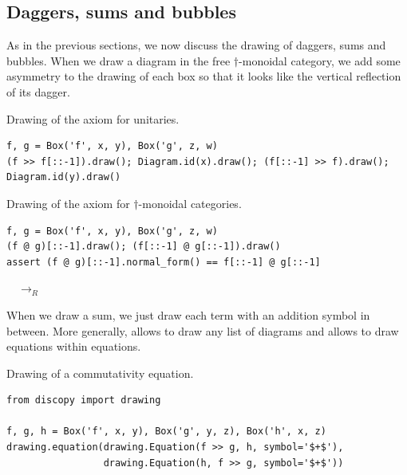 \subsection{Daggers, sums and bubbles}

As in the previous sections, we now discuss the drawing of daggers, sums and bubbles.
When we draw a diagram in the free $\dagger$-monoidal category, we add some asymmetry to the drawing of each box so that it looks like the vertical reflection of its dagger.

\begin{example}
{\normalfont Drawing of the axiom for unitaries.}

\begin{verbatim}
f, g = Box('f', x, y), Box('g', z, w)
(f >> f[::-1]).draw(); Diagram.id(x).draw(); (f[::-1] >> f).draw(); Diagram.id(y).draw()
\end{verbatim}

\begin{center}
 \hspace{100pt}
\end{center}
\end{example}

\begin{example}
{\normalfont Drawing of the axiom for $\dagger$-monoidal categories.}

\begin{verbatim}
f, g = Box('f', x, y), Box('g', z, w)
(f @ g)[::-1].draw(); (f[::-1] @ g[::-1]).draw()
assert (f @ g)[::-1].normal_form() == f[::-1] @ g[::-1]
\end{verbatim}

\begin{center}
$\quad \to_R \quad$ 
\end{center}
\end{example}

When we draw a sum, we just draw each term with an addition symbol in between.
More generally,  allows to draw any list of diagrams and  allows to draw equations within equations.

\begin{example}
{\normalfont Drawing of a commutativity equation.}

\begin{verbatim}
from discopy import drawing

f, g, h = Box('f', x, y), Box('g', y, z), Box('h', x, z)
drawing.equation(drawing.Equation(f >> g, h, symbol='$+$'),
                 drawing.Equation(h, f >> g, symbol='$+$'))
\end{verbatim}
\end{example}

